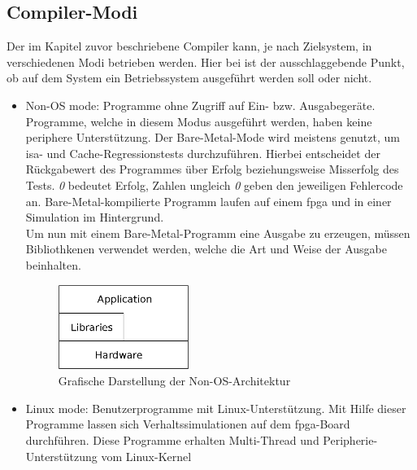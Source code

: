 \subsection{Compiler-Modi}\label{kap:compilermode}

Der im Kapitel zuvor beschriebene Compiler kann, je nach Zielsystem, in verschiedenen Modi betrieben werden. Hier bei ist der ausschlaggebende Punkt, ob auf dem System ein Betriebssystem ausgeführt werden soll oder nicht.\\

\begin{itemize}
  \item Non-OS mode: Programme ohne Zugriff auf Ein- bzw. Ausgabegeräte. Programme, welche in diesem Modus ausgeführt werden, haben keine periphere Unterstützung.
        Der Bare-Metal-Mode wird meistens genutzt, um \ac{isa}- und Cache-Regressionstests durchzuführen. Hierbei entscheidet der Rückgabewert des Programmes über Erfolg beziehungsweise Misserfolg
        des Tests. \emph{0} bedeutet Erfolg, Zahlen ungleich \emph{0} geben den jeweiligen Fehlercode an. Bare-Metal-kompilierte Programm laufen auf einem \ac{fpga} und in einer Simulation
        im Hintergrund. \\
        Um nun mit einem Bare-Metal-Programm eine Ausgabe zu erzeugen, müssen Bibliothkenen verwendet werden, welche die Art und Weise der Ausgabe beinhalten.\\

        \begin{figure}[H]
        \centering
        \includegraphics[width=0.4\textwidth]{Hauptteil/baremetal.eps}
        \caption{Grafische Darstellung der Non-OS-Architektur}\label{fig:baremetal}
        \end{figure}

  \item Linux mode: Benutzerprogramme mit Linux-Unterstützung. Mit Hilfe dieser Programme lassen sich Verhaltssimulationen auf dem \ac{fpga}-Board durchführen. Diese Programme
  erhalten Multi-Thread und Peripherie-Unterstützung vom Linux-Kernel\cite{lowrisc}\\


\end{itemize}
